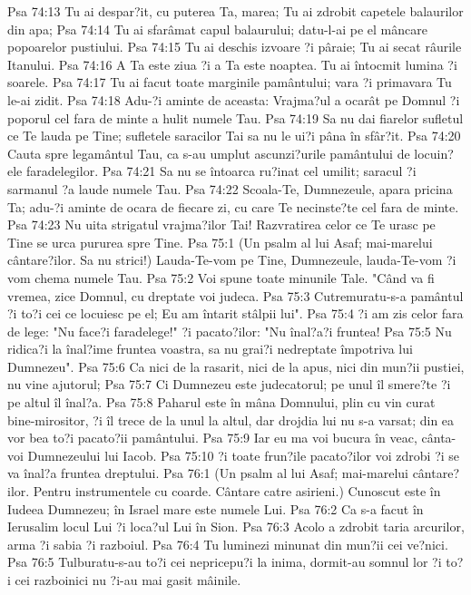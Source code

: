 Psa 74:13  Tu ai despar?it, cu puterea Ta, marea; Tu ai zdrobit capetele balaurilor din apa;
Psa 74:14  Tu ai sfarâmat capul balaurului; datu-l-ai pe el mâncare popoarelor pustiului.
Psa 74:15  Tu ai deschis izvoare ?i pâraie; Tu ai secat râurile Itanului.
Psa 74:16  A Ta este ziua ?i a Ta este noaptea. Tu ai întocmit lumina ?i soarele.
Psa 74:17  Tu ai facut toate marginile pamântului; vara ?i primavara Tu le-ai zidit.
Psa 74:18  Adu-?i aminte de aceasta: Vrajma?ul a ocarât pe Domnul ?i poporul cel fara de minte a hulit numele Tau.
Psa 74:19  Sa nu dai fiarelor sufletul ce Te lauda pe Tine; sufletele saracilor Tai sa nu le ui?i pâna în sfâr?it.
Psa 74:20  Cauta spre legamântul Tau, ca s-au umplut ascunzi?urile pamântului de locuin?ele faradelegilor.
Psa 74:21  Sa nu se întoarca ru?inat cel umilit; saracul ?i sarmanul ?a laude numele Tau.
Psa 74:22  Scoala-Te, Dumnezeule, apara pricina Ta; adu-?i aminte de ocara de fiecare zi, cu care Te necinste?te cel fara de minte.
Psa 74:23  Nu uita strigatul vrajma?ilor Tai! Razvratirea celor ce Te urasc pe Tine se urca pururea spre Tine.
Psa 75:1  (Un psalm al lui Asaf; mai-marelui cântare?ilor. Sa nu strici!) Lauda-Te-vom pe Tine, Dumnezeule, lauda-Te-vom ?i vom chema numele Tau.
Psa 75:2  Voi spune toate minunile Tale. "Când va fi vremea, zice Domnul, cu dreptate voi judeca.
Psa 75:3  Cutremuratu-s-a pamântul ?i to?i cei ce locuiesc pe el; Eu am întarit stâlpii lui".
Psa 75:4  ?i am zis celor fara de lege: "Nu face?i faradelege!" ?i pacato?ilor: "Nu înal?a?i fruntea!
Psa 75:5  Nu ridica?i la înal?ime fruntea voastra, sa nu grai?i nedreptate împotriva lui Dumnezeu".
Psa 75:6  Ca nici de la rasarit, nici de la apus, nici din mun?ii pustiei, nu vine ajutorul;
Psa 75:7  Ci Dumnezeu este judecatorul; pe unul îl smere?te ?i pe altul îl înal?a.
Psa 75:8  Paharul este în mâna Domnului, plin cu vin curat bine-mirositor, ?i îl trece de la unul la altul, dar drojdia lui nu s-a varsat; din ea vor bea to?i pacato?ii pamântului.
Psa 75:9  Iar eu ma voi bucura în veac, cânta-voi Dumnezeului lui Iacob.
Psa 75:10  ?i toate frun?ile pacato?ilor voi zdrobi ?i se va înal?a fruntea dreptului.
Psa 76:1  (Un psalm al lui Asaf; mai-marelui cântare?ilor. Pentru instrumentele cu coarde. Cântare catre asirieni.) Cunoscut este în Iudeea Dumnezeu; în Israel mare este numele Lui.
Psa 76:2  Ca s-a facut în Ierusalim locul Lui ?i loca?ul Lui în Sion.
Psa 76:3  Acolo a zdrobit taria arcurilor, arma ?i sabia ?i razboiul.
Psa 76:4  Tu luminezi minunat din mun?ii cei ve?nici.
Psa 76:5  Tulburatu-s-au to?i cei nepricepu?i la inima, dormit-au somnul lor ?i to?i cei razboinici nu ?i-au mai gasit mâinile.
